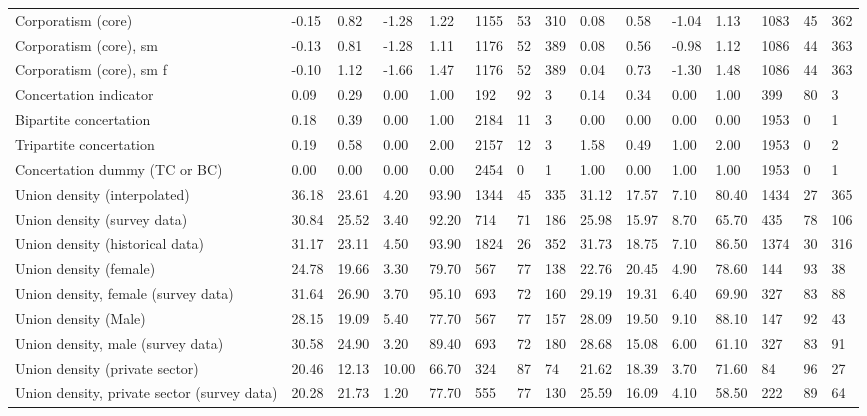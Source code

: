 \begin{longtable}{lllllllllllllll}
Corporatism (core) & -0.15 & 0.82 & -1.28 & 1.22 & 1155 & 53 & 310 & 0.08 & 0.58 & -1.04 & 1.13 & 1083 & 45 & 362\\
\addlinespace
Corporatism (core), sm & -0.13 & 0.81 & -1.28 & 1.11 & 1176 & 52 & 389 & 0.08 & 0.56 & -0.98 & 1.12 & 1086 & 44 & 363\\
Corporatism (core), sm f & -0.10 & 1.12 & -1.66 & 1.47 & 1176 & 52 & 389 & 0.04 & 0.73 & -1.30 & 1.48 & 1086 & 44 & 363\\
Concertation indicator & 0.09 & 0.29 & 0.00 & 1.00 & 192 & 92 & 3 & 0.14 & 0.34 & 0.00 & 1.00 & 399 & 80 & 3\\
Bipartite concertation & 0.18 & 0.39 & 0.00 & 1.00 & 2184 & 11 & 3 & 0.00 & 0.00 & 0.00 & 0.00 & 1953 & 0 & 1\\
Tripartite concertation & 0.19 & 0.58 & 0.00 & 2.00 & 2157 & 12 & 3 & 1.58 & 0.49 & 1.00 & 2.00 & 1953 & 0 & 2\\
\addlinespace
Concertation dummy (TC or BC) & 0.00 & 0.00 & 0.00 & 0.00 & 2454 & 0 & 1 & 1.00 & 0.00 & 1.00 & 1.00 & 1953 & 0 & 1\\
Union density (interpolated) & 36.18 & 23.61 & 4.20 & 93.90 & 1344 & 45 & 335 & 31.12 & 17.57 & 7.10 & 80.40 & 1434 & 27 & 365\\
Union density (survey data) & 30.84 & 25.52 & 3.40 & 92.20 & 714 & 71 & 186 & 25.98 & 15.97 & 8.70 & 65.70 & 435 & 78 & 106\\
Union density (historical data) & 31.17 & 23.11 & 4.50 & 93.90 & 1824 & 26 & 352 & 31.73 & 18.75 & 7.10 & 86.50 & 1374 & 30 & 316\\
Union density (female) & 24.78 & 19.66 & 3.30 & 79.70 & 567 & 77 & 138 & 22.76 & 20.45 & 4.90 & 78.60 & 144 & 93 & 38\\
\addlinespace
Union density, female (survey data) & 31.64 & 26.90 & 3.70 & 95.10 & 693 & 72 & 160 & 29.19 & 19.31 & 6.40 & 69.90 & 327 & 83 & 88\\
Union density (Male) & 28.15 & 19.09 & 5.40 & 77.70 & 567 & 77 & 157 & 28.09 & 19.50 & 9.10 & 88.10 & 147 & 92 & 43\\
Union density, male (survey data) & 30.58 & 24.90 & 3.20 & 89.40 & 693 & 72 & 180 & 28.68 & 15.08 & 6.00 & 61.10 & 327 & 83 & 91\\
Union density (private sector) & 20.46 & 12.13 & 10.00 & 66.70 & 324 & 87 & 74 & 21.62 & 18.39 & 3.70 & 71.60 & 84 & 96 & 27\\
Union density, private sector (survey data) & 20.28 & 21.73 & 1.20 & 77.70 & 555 & 77 & 130 & 25.59 & 16.09 & 4.10 & 58.50 & 222 & 89 & 64\\

\end{longtable}

